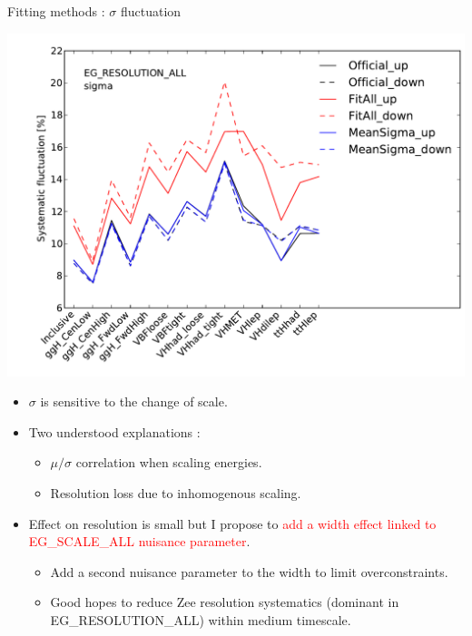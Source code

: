 \begin{frame}{Fitting methods : $\sigma$ fluctuation }

  \begin{minipage}{0.4\linewidth}
    \includegraphics[width=\linewidth]{plots/h013_meanSigma_PhotonSyst_EG_RESOLUTION_ALL_sigma.pdf}\\
  \end{minipage}
  \hfill
  \begin{minipage}{0.59\linewidth}
    \begin{itemize}
    \item $\sigma$ is sensitive to the change of scale.
    \item Two understood explanations :
      \begin{itemize}
      \item $\mu /\sigma$ correlation when scaling energies.
      \item Resolution loss due to inhomogenous scaling.
        \end{itemize}
      \vfill
    \item Effect on resolution is small but I propose to \textcolor{red}{add a width effect linked to EG\_SCALE\_ALL nuisance parameter}.
      \begin{itemize}
      \item Add a second nuisance parameter to the width to limit overconstraints.
      \item Good hopes to reduce Zee resolution systematics (dominant in EG\_RESOLUTION\_ALL) within medium timescale.
      \end{itemize}
    \end{itemize}
  \end{minipage}
\end{frame}
